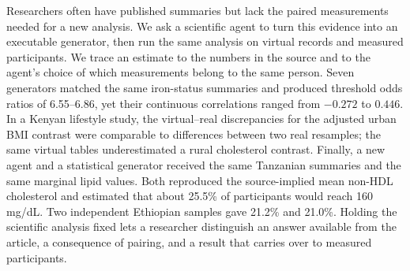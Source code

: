 Researchers often have published summaries but lack the paired measurements needed for a new analysis. We ask a scientific agent to turn this evidence into an executable generator, then run the same analysis on virtual records and measured participants. We trace an estimate to the numbers in the source and to the agent's choice of which measurements belong to the same person. Seven generators matched the same iron-status summaries and produced threshold odds ratios of 6.55--6.86, yet their continuous correlations ranged from $-0.272$ to $0.446$. In a Kenyan lifestyle study, the virtual--real discrepancies for the adjusted urban BMI contrast were comparable to differences between two real resamples; the same virtual tables underestimated a rural cholesterol contrast. Finally, a new agent and a statistical generator received the same Tanzanian summaries and the same marginal lipid values. Both reproduced the source-implied mean non-HDL cholesterol and estimated that about 25.5\% of participants would reach 160 mg/dL. Two independent Ethiopian samples gave 21.2\% and 21.0\%. Holding the scientific analysis fixed lets a researcher distinguish an answer available from the article, a consequence of pairing, and a result that carries over to measured participants.
